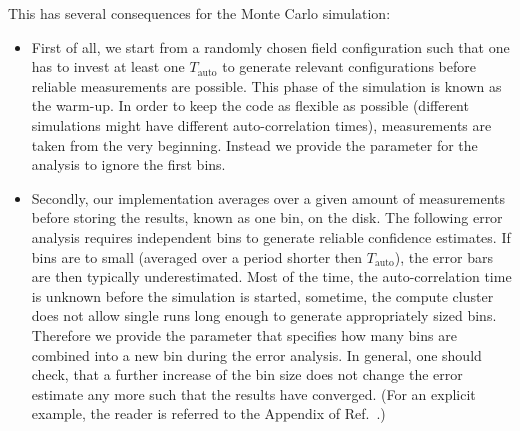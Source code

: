 This has several consequences for the Monte Carlo simulation:
\begin{itemize}
	\item First of all, we start from a randomly chosen field configuration such that one has to invest at least one $T_\mathrm{auto}$ to generate relevant configurations before reliable measurements are possible. This phase of the simulation is known as the warm-up. In order to keep the code as flexible as possible (different simulations might have different auto-correlation times), measurements are taken from the very beginning. Instead we provide the parameter  for the analysis to ignore the first  bins.
	\item Secondly, our implementation averages over a given amount of measurements  before storing the results, known as one bin, on the disk. The following error analysis requires independent bins to generate reliable confidence estimates. If bins are to small (averaged over a period shorter then $T_\mathrm{auto}$), the error bars are then typically underestimated. Most of the time, the auto-correlation time is unknown before the simulation is started, sometime, the compute cluster does not allow single runs long enough to generate appropriately sized bins. Therefore we provide the  parameter that specifies how many bins are combined into a new bin during the error analysis. In general, one should check, that a further increase of the bin size does not change the error estimate any more such that the results have converged. (For an explicit example, the reader is referred to the Appendix of Ref.~\cite{Assaad02}.)


\end{itemize}

